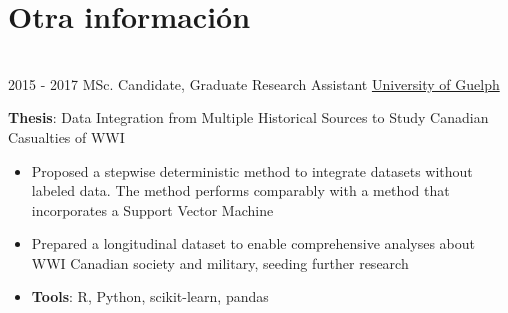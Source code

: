 \documentclass[letterpaper]{twentysecondcv} %
\begin{document}
\section{Otra información}
\begin{twenty}
	\twentyitem
    	{}
		{}
        {}
        {}
        {}
        {}
         \\
	\twentyitem
    	{2015 -}
		{2017}
        {MSc. Candidate, Graduate Research Assistant}
        {\href{http://www.uoguelph.ca/}{University of Guelph}}
        {}
        {
       	\textbf{Thesis}: Data Integration from Multiple Historical Sources to Study Canadian Casualties of WWI
        {\begin{itemize}
        \item Proposed a stepwise deterministic method to integrate datasets without labeled data. The method performs comparably with a method that incorporates a Support Vector Machine
        \item Prepared a longitudinal dataset to enable comprehensive analyses about WWI Canadian society and military, seeding further research
        \item \textbf{Tools}: R, Python, scikit-learn, pandas \vspace{2mm}
		\end{itemize}}
        }
\end{twenty}
\end{document}

